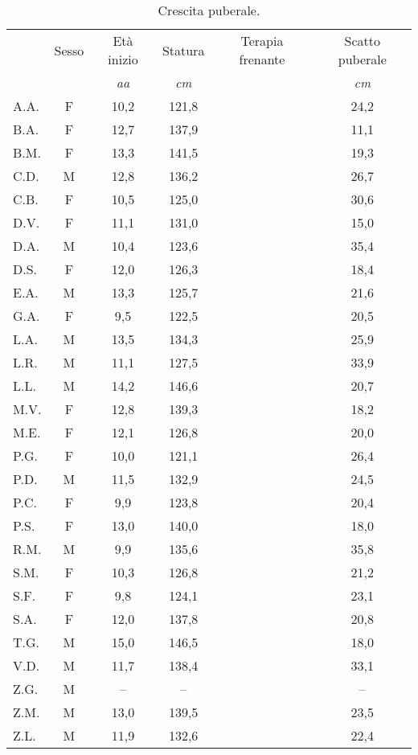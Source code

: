 \begin{table}[!h]
\begin{center}
\begin{tabular}{lccccc}
\toprule
 & Sesso 	& \multicolumn{1}{c}{Età inizio}	& Statura	& Terapia frenante & Scatto puberale \\
 & &  \emph{aa} 	& \emph{cm}	& & \emph{cm}		\\
\midrule
A.A.	& F & 10,2 		& 121,8  		& \checkmark & 24,2 \\
B.A.	& F & 12,7 		& 137,9   		&            & 11,1 \\
B.M.	& F & 13,3 		& 141,5   		&            & 19,3 \\
C.D.	& M & 12,8 		& 136,2   		&            & 26,7 \\
C.B.	& F & 10,5 		& 125,0   		& \checkmark & 30,6 \\
D.V.	& F & 11,1 		& 131,0   		&            & 15,0 \\
D.A.	& M & 10,4 		& 123,6   		& \checkmark & 35,4 \\
D.S.	& F & 12,0 		& 126,3   		&            & 18,4 \\
E.A.	& M & 13,3		& 125,7   		&            & 21,6 \\
G.A.	& F &  9,5  		& 122,5   		&            & 20,5 \\
L.A.	& M & 13,5 		& 134,3   		&            & 25,9 \\
L.R.	& M & 11,1 		& 127,5   		&            & 33,9 \\
L.L.	& M & 14,2 		& 146,6   		&            & 20,7 \\
M.V.	& F & 12,8 		& 139,3   		&            & 18,2 \\
M.E.	& F & 12,1 		& 126,8   		&            & 20,0 \\
P.G.	& F & 10,0 		& 121,1   		& \checkmark & 26,4 \\
P.D.	& M & 11,5 		& 132,9   		&            & 24,5 \\
P.C.	& F &  9,9  		& 123,8   		& \checkmark & 20,4 \\
P.S.	& F & 13,0 		& 140,0   		&            & 18,0 \\
R.M.	& M &  9,9  		& 135,6   		& \checkmark & 35,8 \\
S.M.	& F & 10,3 		& 126,8   		& \checkmark & 21,2 \\
S.F.	& F &  9,8  		& 124,1   		&            & 23,1 \\
S.A.	& F & 12,0 		& 137,8   		&            & 20,8 \\
T.G.    & M & 15,0      	& 146,5         	&            & 18,0 \\ 
V.D.	& M & 11,7 		& 138,4   		&            & 33,1 \\
Z.G.	& M &  --    		& --   			&            & --   \\
Z.M.	& M & 13,0 		& 139,5   		&            & 23,5 \\
Z.L.	& M & 11,9 		& 132,6   		&            & 22,4 \\
\bottomrule
\end{tabular}
\end{center}
\caption{Crescita puberale.}
\label{tab:Puberta}
\end{table}

